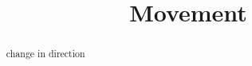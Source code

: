 \documentclass{ximera}
\title{Movement}
\begin{document}
\begin{abstract}
change in direction
\end{abstract}
\maketitle
\end{document}
